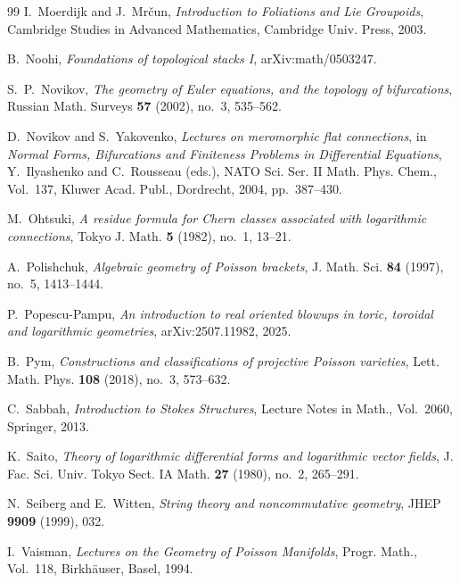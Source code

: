 \documentclass[11pt]{amsart}
\theoremstyle{plain}
\theoremstyle{definition}
\theoremstyle{definition}
\begin{document}
\begin{thebibliography}{99}
I.~Moerdijk and J.~Mr\v{c}un,
\emph{Introduction to Foliations and Lie Groupoids},
Cambridge Studies in Advanced Mathematics, Cambridge Univ. Press, 2003.

B.~Noohi,
\emph{Foundations of topological stacks I},
arXiv:math/0503247.

S.~P.~Novikov,
\emph{The geometry of Euler equations, and the topology of bifurcations},
Russian Math. Surveys \textbf{57} (2002), no.~3, 535--562.

D.~Novikov and S.~Yakovenko,
\emph{Lectures on meromorphic flat connections},
in \emph{Normal Forms, Bifurcations and Finiteness Problems in Differential Equations},
Y.~Ilyashenko and C.~Rousseau (eds.),
NATO Sci. Ser. II Math. Phys. Chem., Vol.~137,
Kluwer Acad. Publ., Dordrecht, 2004, pp.~387--430.

M.~Ohtsuki,
\emph{A residue formula for Chern classes associated with logarithmic connections},
Tokyo J. Math. \textbf{5} (1982), no.~1, 13--21.

A.~Polishchuk,
\emph{Algebraic geometry of Poisson brackets},
J. Math. Sci. \textbf{84} (1997), no.~5, 1413--1444.

P.~Popescu-Pampu,
\emph{An introduction to real oriented blowups in toric, toroidal and logarithmic geometries},
arXiv:2507.11982, 2025.

B.~Pym,
\emph{Constructions and classifications of projective Poisson varieties},
Lett. Math. Phys. \textbf{108} (2018), no.~3, 573--632.

C.~Sabbah,
\emph{Introduction to Stokes Structures},
Lecture Notes in Math., Vol.~2060, Springer, 2013.

K.~Saito,
\emph{Theory of logarithmic differential forms and logarithmic vector fields},
J. Fac. Sci. Univ. Tokyo Sect. IA Math. \textbf{27} (1980), no.~2, 265--291.

N.~Seiberg and E.~Witten,
\emph{String theory and noncommutative geometry},
JHEP \textbf{9909} (1999), 032.

I.~Vaisman,
\emph{Lectures on the Geometry of Poisson Manifolds},
Progr. Math., Vol.~118, Birkh\"auser, Basel, 1994.

\end{thebibliography}
 
\end{document}
